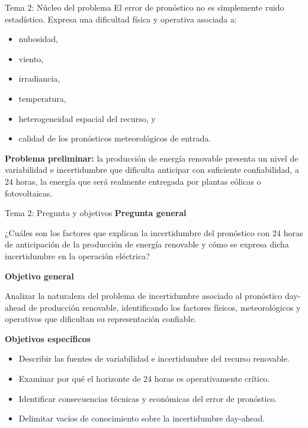\documentclass[aspectratio=169]{beamer}
\begin{document}
\begin{frame}{Tema 2: Núcleo del problema}
\justifying
El error de pronóstico no es simplemente ruido estadístico. Expresa una dificultad física y operativa asociada a:
\begin{itemize}[leftmargin=*]
    \item nubosidad,
    \item viento,
    \item irradiancia,
    \item temperatura,
    \item heterogeneidad espacial del recurso, y
    \item calidad de los pronósticos meteorológicos de entrada.
\end{itemize}

\vspace{0.5em}
\textbf{Problema preliminar:} la producción de energía renovable presenta un nivel de variabilidad e incertidumbre que dificulta anticipar con suficiente confiabilidad, a 24 horas, la energía que será realmente entregada por plantas eólicas o fotovoltaicas.
\end{frame}

\begin{frame}{Tema 2: Pregunta y objetivos}
\textbf{Pregunta general}

¿Cuáles son los factores que explican la incertidumbre del pronóstico con 24 horas de anticipación de la producción de energía renovable y cómo se expresa dicha incertidumbre en la operación eléctrica?

\vspace{0.7em}
\textbf{Objetivo general}

Analizar la naturaleza del problema de incertidumbre asociado al pronóstico day-ahead de producción renovable, identificando los factores físicos, meteorológicos y operativos que dificultan su representación confiable.

\vspace{0.7em}
\textbf{Objetivos específicos}
\begin{itemize}[leftmargin=*]
    \item Describir las fuentes de variabilidad e incertidumbre del recurso renovable.
    \item Examinar por qué el horizonte de 24 horas es operativamente crítico.
    \item Identificar consecuencias técnicas y económicas del error de pronóstico.
    \item Delimitar vacíos de conocimiento sobre la incertidumbre day-ahead.
\end{itemize}
\end{frame}
\end{document}
